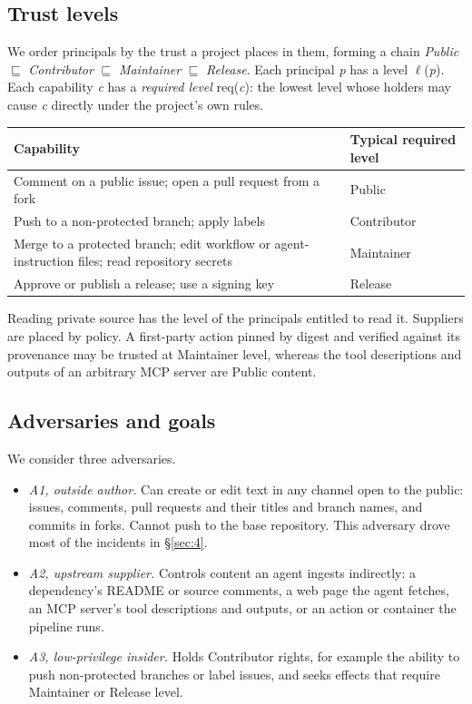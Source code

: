 \documentclass[acmsmall,screen,review]{acmart}
\begin{document}
\subsection{Trust levels}\label{sec:3.2}

We order principals by the trust a project places in them, forming a chain \emph{Public} $\sqsubseteq$ \emph{Contributor} $\sqsubseteq$ \emph{Maintainer} $\sqsubseteq$ \emph{Release}. Each principal \emph{p} has a level $\ell$(\emph{p}). Each capability \emph{c} has a \emph{required level} req(\emph{c}): the lowest level whose holders may cause \emph{c} directly under the project's own rules.

\begin{center}
\small
\begin{tabularx}{\linewidth}{@{}>{\hsize=1.665\hsize\raggedright\arraybackslash}X>{\hsize=0.335\hsize\raggedright\arraybackslash}X@{}}
\toprule
\textbf{Capability} & \textbf{Typical required level} \\
\midrule
Comment on a public issue; open a pull request from a fork & Public \\
Push to a non-protected branch; apply labels & Contributor \\
Merge to a protected branch; edit workflow or agent-instruction files; read repository secrets & Maintainer \\
Approve or publish a release; use a signing key & Release \\
\bottomrule
\end{tabularx}
\end{center}

Reading private source has the level of the principals entitled to read it. Suppliers are placed by policy. A first-party action pinned by digest and verified against its provenance may be trusted at Maintainer level, whereas the tool descriptions and outputs of an arbitrary MCP server are Public content.


\subsection{Adversaries and goals}\label{sec:3.3}

We consider three adversaries.

\begin{itemize}
\item \emph{A1, outside author.} Can create or edit text in any channel open to the public: issues, comments, pull requests and their titles and branch names, and commits in forks. Cannot push to the base repository. This adversary drove most of the incidents in \S\ref{sec:4}.
\item \emph{A2, upstream supplier.} Controls content an agent ingests indirectly: a dependency's README or source comments, a web page the agent fetches, an MCP server's tool descriptions and outputs, or an action or container the pipeline runs.
\item \emph{A3, low-privilege insider.} Holds Contributor rights, for example the ability to push non-protected branches or label issues, and seeks effects that require Maintainer or Release level.
\end{itemize}
\end{document}
